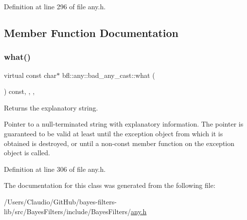 Definition at line 296 of file any.\+h.



\subsection{Member Function Documentation}
\mbox{\label{classbfl_1_1any_1_1bad__any__cast_a5e59fa8f7c57b8a06fb35bf66dd887eb}} 
\subsubsection{\texorpdfstring{what()}{what()}}
{\footnotesize\ttfamily virtual const char$\ast$ bfl\+::any\+::bad\+\_\+any\+\_\+cast\+::what (\begin{DoxyParamCaption}{ }\end{DoxyParamCaption}) const\hspace{0.3cm}{\ttfamily [inline]}, {\ttfamily [override]}, {\ttfamily [virtual]}, {\ttfamily [noexcept]}}



Returns the explanatory string. 

Pointer to a null-\/terminated string with explanatory information. The pointer is guaranteed to be valid at least until the exception object from which it is obtained is destroyed, or until a non-\/const member function on the exception object is called. 

Definition at line 306 of file any.\+h.



The documentation for this class was generated from the following file\+:\begin{DoxyCompactItemize}
\item 
/\+Users/\+Claudio/\+Git\+Hub/bayes-\/filters-\/lib/src/\+Bayes\+Filters/include/\+Bayes\+Filters/\mbox{\hyperlink{any_8h}{any.\+h}}\end{DoxyCompactItemize}
